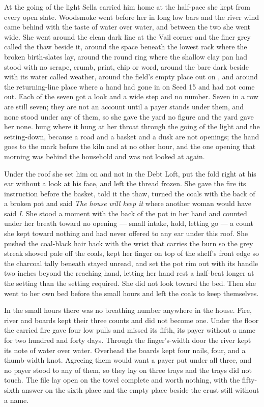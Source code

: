 At the going of the light Sella carried him home at the half-pace she kept from every open slate. Woodsmoke went before her in long low bars and the river wind came behind with the taste of water over water, and between the two she went wide. She went around the clean dark line at the Vail corner and the finer grey called the thaw beside it, around the space beneath the lowest rack where the broken birth-slates lay, around the round ring where the shallow clay pan had stood with no scrape, crumb, print, chip or word, around the bare dark  beside  with its water called weather, around the field's empty place out on , and around the returning-line place where a hand had gone in on Seed 15 and had not come out. Each of the seven got a look and a wide step and no number. Seven in a row are still seven; they are not an account until a payer stands under them, and none stood under any of them, so she gave the yard no figure and the yard gave her none.  hung where it hung at her throat through the going of the light and the setting-down, because a road and a basket and a dusk are not openings; the hand goes to the mark before the kiln and at no other hour, and the one opening that morning was behind the household and was not looked at again.

Under the roof she set him on  and not in the Debt Loft, put the fold right at his ear without a look at his face, and left the thread frozen. She gave the fire its instruction before the basket, told it the thaw, turned the coals with the back of a broken pot and said \emph{The house will keep it} where another woman would have said \emph{I}. She stood a moment with the back of the pot in her hand and counted under her breath toward no opening --- small intake, hold, letting go --- a count she kept toward nothing and had never offered to any ear under this roof. She pushed the coal-black hair back with the wrist that carries the burn so the grey streak showed pale off the coals, kept her finger on top of the shelf's front edge so the charcoal tally beneath stayed unread, and set the pot rim out with its handle two inches beyond the reaching hand, letting her hand rest a half-beat longer at the setting than the setting required. She did not look toward the bed. Then she went to her own bed before the small hours and left the coals to keep themselves.

In the small hours there was no breathing number anywhere in the house. Fire, river and boards kept their three counts and did not become one. Under the floor the carried fire gave four low pulls and missed its fifth, its payer without a name for two hundred and forty days. Through the finger's-width door the river kept its note of water over water. Overhead the boards kept four nails, four, and a thumb-width knot. Agreeing them would want a payer put under all three, and no payer stood to any of them, so they lay on three trays and the trays did not touch. The file lay open on the towel complete and worth nothing, with the fifty-sixth answer on the sixth place and the empty place beside the crust still without a name.

